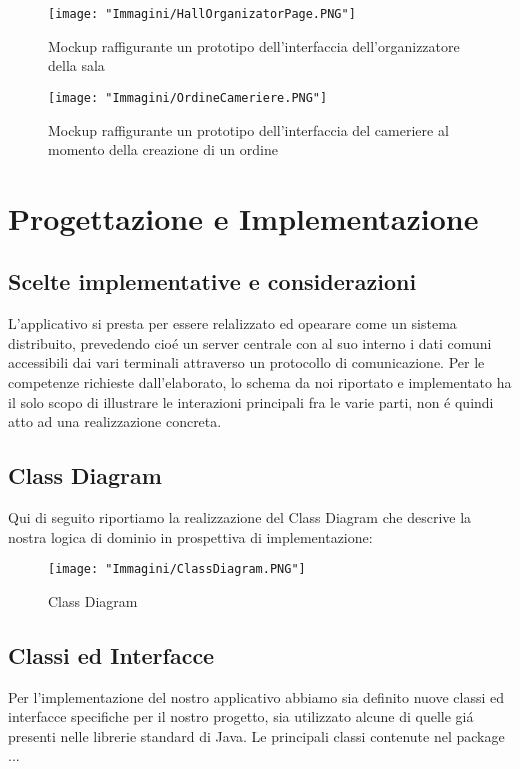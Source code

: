 \documentclass{article}
\begin{document}
\begin{figure}[!h]
\centering
\texttt{[image: "Immagini/HallOrganizatorPage.PNG"]}
\caption{Mockup raffigurante un prototipo dell'interfaccia dell'organizzatore della sala}
\end{figure}

\begin{figure}[!h]
\centering
\texttt{[image: "Immagini/OrdineCameriere.PNG"]}
\caption{Mockup raffigurante un prototipo dell'interfaccia del cameriere al momento della creazione di un ordine}
\end{figure}

\section{Progettazione e Implementazione}
\subsection{Scelte implementative e considerazioni}
L'applicativo si presta per essere relalizzato ed opearare come un sistema distribuito, prevedendo cio\'e un server centrale con al suo interno i dati comuni accessibili dai vari terminali attraverso un protocollo di comunicazione. Per le competenze richieste dall'elaborato, lo schema da noi riportato e implementato ha il solo scopo di illustrare le interazioni principali fra le varie parti, non \'e quindi atto ad una realizzazione concreta.  


\subsection{Class Diagram}
Qui di seguito riportiamo la realizzazione del Class Diagram che descrive la nostra logica di dominio in prospettiva di implementazione:

\begin{figure}[!h]
\centering
\texttt{[image: "Immagini/ClassDiagram.PNG"]}
\caption{Class Diagram}
\label{ClassDiagram}
\end{figure}

\newpage

\subsection{Classi ed Interfacce}
Per l'implementazione del nostro applicativo abbiamo sia definito nuove classi ed interfacce specifiche per il nostro progetto, sia utilizzato alcune di quelle gi\'a presenti nelle librerie standard di Java. Le principali classi contenute nel package ... 
\end{document}
